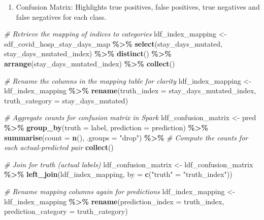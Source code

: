 \documentclass[
]{article}
\newenvironment{Shaded}{\begin{snugshade}}{\end{snugshade}}
\newcommand{\AttributeTok}[1]{\textcolor[rgb]{0.13,0.29,0.53}{#1}}
\newcommand{\CommentTok}[1]{\textcolor[rgb]{0.56,0.35,0.01}{\textit{#1}}}
\newcommand{\FunctionTok}[1]{\textcolor[rgb]{0.13,0.29,0.53}{\textbf{#1}}}
\newcommand{\NormalTok}[1]{#1}
\newcommand{\OtherTok}[1]{\textcolor[rgb]{0.56,0.35,0.01}{#1}}
\newcommand{\SpecialCharTok}[1]{\textcolor[rgb]{0.81,0.36,0.00}{\textbf{#1}}}
\newcommand{\StringTok}[1]{\textcolor[rgb]{0.31,0.60,0.02}{#1}}
\providecommand{\tightlist}{%
  \setlength{\itemsep}{0pt}\setlength{\parskip}{0pt}}
\begin{document}
\begin{enumerate}
\def\labelenumi{\arabic{enumi}.}
\setcounter{enumi}{1}
\tightlist
\item
  Confusion Matrix: Highlights true positives, false positives, true
  negatives and false negatives for each class.
\end{enumerate}

\begin{Shaded}
\begin{Highlighting}[]
\CommentTok{\# Retrieve the mapping of indices to categories}
\NormalTok{ldf\_index\_mapping }\OtherTok{\textless{}{-}}\NormalTok{ sdf\_covid\_hosp\_stay\_days\_map }\SpecialCharTok{\%\textgreater{}\%}
  \FunctionTok{select}\NormalTok{(stay\_days\_mutated, stay\_days\_mutated\_index) }\SpecialCharTok{\%\textgreater{}\%}
  \FunctionTok{distinct}\NormalTok{() }\SpecialCharTok{\%\textgreater{}\%}
  \FunctionTok{arrange}\NormalTok{(stay\_days\_mutated\_index) }\SpecialCharTok{\%\textgreater{}\%}
  \FunctionTok{collect}\NormalTok{()}

\CommentTok{\# Rename the columns in the mapping table for clarity}
\NormalTok{ldf\_index\_mapping }\OtherTok{\textless{}{-}}\NormalTok{ ldf\_index\_mapping }\SpecialCharTok{\%\textgreater{}\%}
  \FunctionTok{rename}\NormalTok{(}\AttributeTok{truth\_index =}\NormalTok{ stay\_days\_mutated\_index,}
    \AttributeTok{truth\_category =}\NormalTok{ stay\_days\_mutated)}

\CommentTok{\# Aggregate counts for confusion matrix in Spark}
\NormalTok{ldf\_confusion\_matrix }\OtherTok{\textless{}{-}}\NormalTok{ pred }\SpecialCharTok{\%\textgreater{}\%}
  \FunctionTok{group\_by}\NormalTok{(}\AttributeTok{truth =}\NormalTok{ label, }\AttributeTok{prediction =}\NormalTok{ prediction) }\SpecialCharTok{\%\textgreater{}\%}
  \FunctionTok{summarise}\NormalTok{(}\AttributeTok{count =} \FunctionTok{n}\NormalTok{(), }\AttributeTok{.groups =} \StringTok{"drop"}\NormalTok{) }\SpecialCharTok{\%\textgreater{}\%}  \CommentTok{\# Compute the counts for each actual{-}predicted pair}
  \FunctionTok{collect}\NormalTok{()}

\CommentTok{\# Join for truth (actual labels)}
\NormalTok{ldf\_confusion\_matrix }\OtherTok{\textless{}{-}}\NormalTok{ ldf\_confusion\_matrix }\SpecialCharTok{\%\textgreater{}\%}
  \FunctionTok{left\_join}\NormalTok{(ldf\_index\_mapping, }\AttributeTok{by =} \FunctionTok{c}\NormalTok{(}\StringTok{"truth"} \OtherTok{=} \StringTok{"truth\_index"}\NormalTok{))}

\CommentTok{\# Rename mapping columns again for predictions}
\NormalTok{ldf\_index\_mapping }\OtherTok{\textless{}{-}}\NormalTok{ ldf\_index\_mapping }\SpecialCharTok{\%\textgreater{}\%}
  \FunctionTok{rename}\NormalTok{(}\AttributeTok{prediction\_index =}\NormalTok{ truth\_index, }\AttributeTok{prediction\_category =}\NormalTok{ truth\_category)}


\end{Highlighting}
\end{Shaded}
\end{document}
